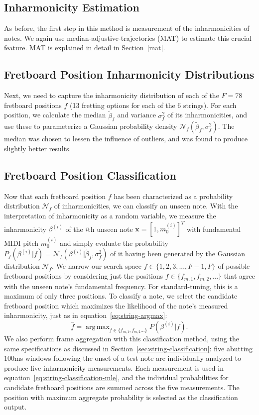 \documentclass[12pt]{cmuthesis}
\DeclareMathOperator*{\argmax}{arg\,max}
\begin{document}
\subsection{Inharmonicity Estimation}
As before, the first step in this method is measurement of the inharmonicities of notes. We again use median-adjustive-trajectories (MAT) to estimate this crucial feature. MAT is explained in detail in Section~\ref{mat}.

\subsection{Fretboard Position Inharmonicity Distributions}
Next, we need to capture the inharmonicity distribution of each of the $F = 78$ fretboard positions $f$ (13 fretting options for each of the 6 strings). For each position, we calculate the median $\tilde{\beta}_f$ and variance $\sigma^2_f$ of its inharmonicities, and use these to parameterize a Gaussian probability density $\mathcal{N}_f(\tilde{\beta}_f,\sigma^2_f)$. The median was chosen to lessen the influence of outliers, and was found to produce slightly better results.

\subsection{Fretboard Position Classification}
Now that each fretboard position $f$ has been characterized as a probability distribution $\mathcal{N}_f$ of inharmonicities, we can classify an unseen note. With the interpretation of inharmonicity as a random variable, we measure the inharmonicity $\beta^{(i)}$ of the $i$th unseen note $\mathbf{x}=[1,m_0^{(i)}]^T$ with fundamental MIDI pitch $m_0^{(i)}$ and simply evaluate the probability $P_f(\beta^{(i)} | f) = \mathcal{N}_f(\beta^{(i)} | \tilde{\beta}_f,\sigma^2_f)$ of it having been generated by the Gaussian distribution $\mathcal{N}_f$. We narrow our search space $f \in \{1,2,3,...,F-1,F\}$ of possible fretboard positions by considering just the positions $f \in \{f_{m,1},f_{m,2},...\}$ that agree with the unseen note's fundamental frequency. For standard-tuning, this is a maximum of only three positions. To classify a note, we select the candidate fretboard position which maximizes the likelihood of the note's measured inharmonicity, just as in equation~\eqref{eq:string-argmax}:
\begin{equation}
\hat{f} = \argmax_{f\in\{f_{m,1},f_{m,2}...\}}P(\beta^{(i)} | f).
\label{eq:string-classification-mle}
\end{equation}
We also perform frame aggregation with this classification method, using the same specifications as discussed in Section~\ref{sec:string-classification}: five abutting 100ms windows following the onset of a test note are individually analyzed to produce five inharmonicity measurements. Each measurement is used in equation~\eqref{eq:string-classification-mle}, and the individual probabilities for candidate fretboard positions are summed across the five measurements. The position with maximum aggregate probability is selected as the classification output.
\end{document}
